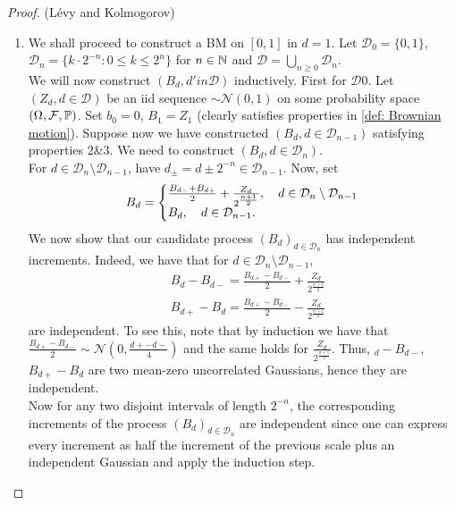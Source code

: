 \documentclass{article}
\begin{document}
\begin{proof}{(L\'{e}vy and Kolmogorov)}

    \begin{enumerate}
    \item We shall proceed to construct a BM on $ [0,1]$ in $ d = 1$. Let $ \mathcal{D}_{0} = \{0,1\}$, $ \mathcal{D}_{n} = \{k\cdot 2^{-n}: 0\leq k \leq 2^n\}$ for $ n\in \mathbb{N}$ and $ \mathcal{D} = \displaystyle\bigcup_{n\geq 0} \mathcal{D}_{n}$.\\ 

		    We will now construct $ (B_{d}, d'in \mathcal{D})$ inductively. First for $ \mathcal{D}0$. Let $ (Z_{d}, d\in \mathcal{D})$ be an iid sequence $ \sim \mathcal{N}(0,1)$ on some probability space $ (\Omega, \mathcal{F}, \mathbb{P})$. Set $ b_{0} = 0$, $ B_{1} = Z_{1}$ (clearly satisfies properties in \ref{def: Brownian motion}). Suppose now we have constructed $ (B_{d}, d\in \mathcal{D}_{n-1})$ satisfying properties $ 2 \& 3$. We need to construct $ (B_{d}, d\in \mathcal{D}_{n})$.\\ 

		    For $ d\in \mathcal{D}_{n}\setminus \mathcal{D}_{n-1}$, have $d_{\pm} = d\pm 2^{-n}\in \mathcal{D}_{n-1}$. Now, set
		    \[
	 B_{d} =   \left\lbrace
		    \begin{array}{@{}l@{}}
		       \frac{B_{d-}+B_{d+}}{2}+\frac{Z_{d}}{2^{\frac{n+1}{2}}}, \quad d\in \mathcal{D}_{n}\setminus \mathcal{D}_{n-1} \\
		        B_{d}, \quad d\in \mathcal{D}_{n-1}.
		    \end{array}\right.
		    \]
		   We now show that our candidate process $ (B_{d})_{d\in \mathcal{D}_{n}}$ has independent increments. Indeed, we have that for $ d\in \mathcal{D}_{n}\setminus \mathcal{D}_{n-1}$,
		   \[
			   \begin{array}{cc}
		       &B_{d}-B_{d-} = \frac{B_{d+}-B_{d-}}{2}+\frac{Z_{d}}{2^{\frac{n+1}{2}}}\\ 
		       &B_{d+}-B_{d} = \frac{B_{d+}-B_{d-}}{2}-\frac{Z_{d}}{2^{\frac{n+1}{2}}}
		   \end{array}		   
		   \]
		   are independent. To see this, note that by induction we have that $\frac{B_{d+}-B_{d-}}{2}\sim \mathcal{N}(0, \frac{d+-d-}{4})$ and the same holds for $ \frac{Z_{d}}{2^{\frac{n+1}{2}}}$. Thus, $ _{d}-B_{d-}$, $B_{d+}-B_{d}$ are two mean-zero uncorrelated Gaussians, hence they are independent.\\ 

		   Now for any two disjoint intervals of length $ 2^{-n}$, the corresponding increments of the process $ (B_{d})_{d\in \mathcal{D}_{n}}$ are independent since one can express every increment as half the increment of the previous scale plus an independent Gaussian and apply the induction step.\\ 


\end{enumerate}
\end{proof}
\end{document}
